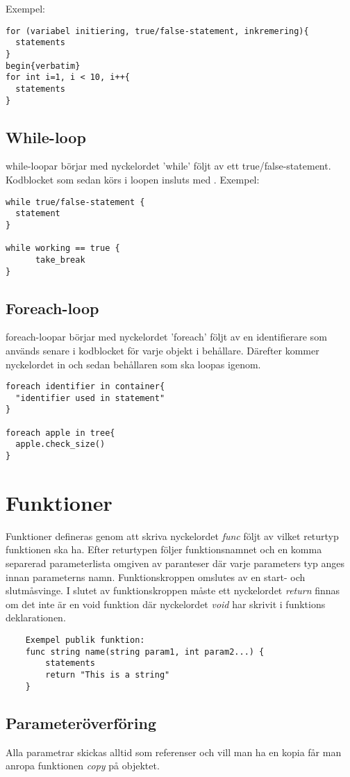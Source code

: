 \documentclass{TDP003mall}
\begin{document}
Exempel:
\begin{verbatim}
for (variabel initiering, true/false-statement, inkremering){
  statements
}
begin{verbatim}
for int i=1, i < 10, i++{
  statements
}
\end{verbatim}
\subsection{While-loop}
while-loopar börjar med nyckelordet 'while' följt av ett true/false-statement. Kodblocket som sedan körs i loopen insluts med {}.
Exempel:
\begin{verbatim}
while true/false-statement {
  statement
}

while working == true {
      take_break
}
\end{verbatim}
\subsection{Foreach-loop}
foreach-loopar börjar med nyckelordet 'foreach' följt av en identifierare som används senare i kodblocket för varje objekt i behållare.
Därefter kommer nyckelordet in och sedan behållaren som ska loopas igenom. 
\begin{verbatim}
foreach identifier in container{
  "identifier used in statement"
}

foreach apple in tree{
  apple.check_size()
}
\end{verbatim}
    \section{Funktioner}
    Funktioner defineras genom att skriva nyckelordet \emph{func} följt av vilket returtyp funktionen ska ha. Efter returtypen följer funktionsnamnet och en komma separerad parameterlista omgiven av paranteser där varje parameters typ anges innan parameterns namn. Funktionskroppen omslutes av en start- och slutmåsvinge. I slutet av funktionskroppen måste ett nyckelordet \emph{return} finnas om det inte är en void funktion där nyckelordet \emph{void} har skrivit i funktions deklarationen.

    \begin{verbatim}
    Exempel publik funktion:
    func string name(string param1, int param2...) {
        statements
        return "This is a string"
    }  
\end{verbatim}
    
    \subsection{Parameteröverföring}
    Alla parametrar skickas alltid som referenser och vill man ha en kopia får man anropa funktionen \emph{copy} på objektet.
\end{document}
